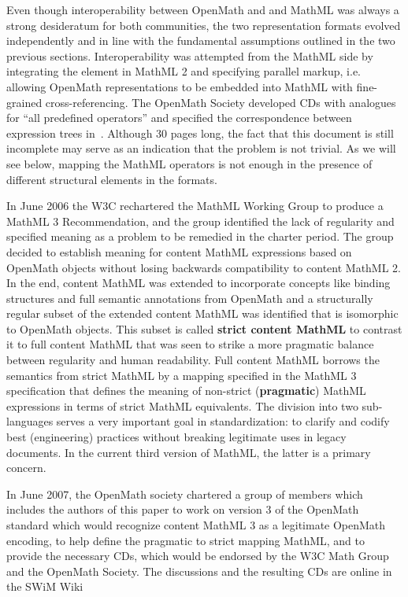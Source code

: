 \documentclass{llncs}
\begin{document}
Even though interoperability between OpenMath and and MathML was always a strong
desideratum for both communities, the two representation formats evolved independently and
in line with the fundamental assumptions outlined in the two previous
sections. Interoperability was attempted from the MathML side by integrating the
{} element in MathML 2 and specifying parallel markup, i.e. allowing
OpenMath representations to be embedded into MathML with fine-grained
cross-referencing. The OpenMath Society developed CDs with analogues for ``all predefined
operators'' and specified the correspondence between expression trees
in~\cite{CarDAvDew:cbmao01}. Although 30 pages long, the fact that this document is still
incomplete may serve as an indication that the problem is not trivial. As we will see
below, mapping the MathML operators is not enough in the presence of different structural
elements in the formats.

In June 2006 the W3C rechartered the MathML Working Group to produce a MathML 3
Recommendation, and the group identified the lack of regularity and specified meaning as a
problem to be remedied in the charter period. The group decided to establish meaning for
content MathML expressions based on OpenMath objects without losing backwards
compatibility to content MathML 2. In the end, content MathML was extended to incorporate
concepts like binding structures and full semantic annotations from OpenMath and a
structurally regular subset of the extended content MathML was identified that is
isomorphic to OpenMath objects. This subset is called {\textbf{strict content MathML}} to
contrast it to full content MathML that was seen to strike a more pragmatic balance
between regularity and human readability. Full content MathML borrows the semantics from
strict MathML by a mapping specified in the MathML 3 specification that defines the meaning
of non-strict ({\textbf{pragmatic}}) MathML expressions in terms of strict MathML
equivalents. The division into two sub-languages serves a very important goal in
standardization: to clarify and codify best (engineering) practices without breaking
legitimate uses in legacy documents. In the current third version of MathML, the latter is
a primary concern. 

In June 2007, the OpenMath society chartered a group of members which includes the authors
of this paper to work on version 3 of the OpenMath standard which would recognize content
MathML 3 as a legitimate OpenMath encoding, to help define the pragmatic to strict mapping
MathML, and to provide the necessary CDs, which would be endorsed by the W3C Math Group
and the OpenMath Society. The discussions and the resulting CDs are online in the SWiM
Wiki~\cite{LangeGonzalez:SWiM-Sentido08}~\cite{OpenMathWiki}
\end{document}
